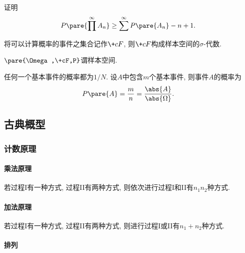\documentclass[../Statistics.tex]{subfiles}
\begin{document}
\begin{sample}
    \begin{ex}
        证明
        \[ P\pare{\prod^\infty A_n} \ge \sum^\infty P\pare{A_n} - n+1. \]
    \end{ex}
\end{sample}
\begin{remark}
    将可以计算概率的事件之集合记作$\+cF$, 则$\+cF$构成样本空间的$\sigma$-代数.
\end{remark}
\begin{definition}[概率空间]
    $\pare{\Omega,\+cF,P}$谓样本空间.
\end{definition}
\begin{corollary}
    任何一个基本事件的概率都为$1/N$. 设$A$中包含$m$个基本事件, 则事件$A$的概率为
\[ P\pare{A} = \frac{m}{n} = \frac{\abs{A}}{\abs{\Omega}}. \]
\end{corollary}



\subsection{古典概型} %
\label{sub:古典概型}

\subsubsection{计数原理} %
\label{ssub:计数原理}

\paragraph{乘法原理} %
\label{par:乘法原理}

若过程I有一种方式, 过程II有两种方式, 则依次进行过程I和II有$n_1n_2$种方式.


\paragraph{加法原理} %
\label{par:加法原理}

若过程I有一种方式, 过程II有两种方式, 则进行过程I或II有$n_1 + n_2$种方式.


\paragraph{排列} %
\label{par:排列}
\end{document}
